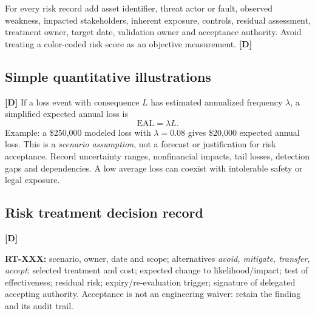 \documentclass[10pt,letterpaper,oneside]{article}
\newcommand{\designed}{\textsf{\color{accent}\textbf{[D]}}}
\begin{document}
For every risk record add asset identifier, threat actor or fault, observed weakness, impacted stakeholders, inherent exposure, controls, residual assessment, treatment owner, target date, validation owner and acceptance authority. Avoid treating a color-coded risk score as an objective measurement. \designed{}
\subsection{Simple quantitative illustrations}\designed{}
If a loss event with consequence \(L\) has estimated annualized frequency \(\lambda\), a simplified expected annual loss is
\[\mathrm{EAL}=\lambda L.\]
Example: a \$250,000 modeled loss with \(\lambda=0.08\) gives \$20,000 expected annual loss. This is a \emph{scenario assumption}, not a forecast or justification for risk acceptance. Record uncertainty ranges, nonfinancial impacts, tail losses, detection gaps and dependencies. A low average loss can coexist with intolerable safety or legal exposure.

\subsection{Risk treatment decision record}\designed{}
\begin{warningbox}\textbf{RT-XXX:} scenario, owner, date and scope; alternatives \emph{avoid, mitigate, transfer, accept}; selected treatment and cost; expected change to likelihood/impact; test of effectiveness; residual risk; expiry/re-evaluation trigger; signature of delegated accepting authority. Acceptance is not an engineering waiver: retain the finding and its audit trail.\end{warningbox}
\end{document}

